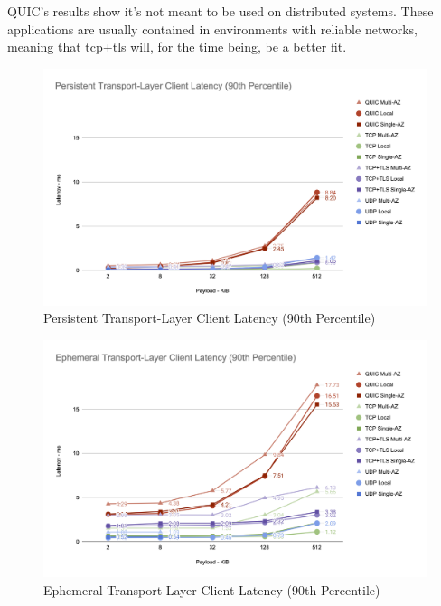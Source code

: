 QUIC’s results show it's not meant to be used on distributed systems. These applications are usually contained in environments with reliable networks, meaning that \gls{tcp}+\gls{tls} will, for the time being, be a better fit.

\clearpage

\begin{figure}[h!]
    \centering
    \includegraphics[width=\linewidth]{figures/charts/Persistent Transport-Layer Client Latency (90th Percentile).png}
    \caption{Persistent Transport-Layer Client Latency (90th Percentile)}
    \label{fig:persistent_transport_latency}
\end{figure}

\begin{figure}[h!]
    \centering
    \includegraphics[width=\linewidth]{figures/charts/Ephemeral Transport-Layer Client Latency (90th Percentile).png}
    \caption{Ephemeral Transport-Layer Client Latency (90th Percentile)}
    \label{fig:ephemeral_transport_latency}
\end{figure}

